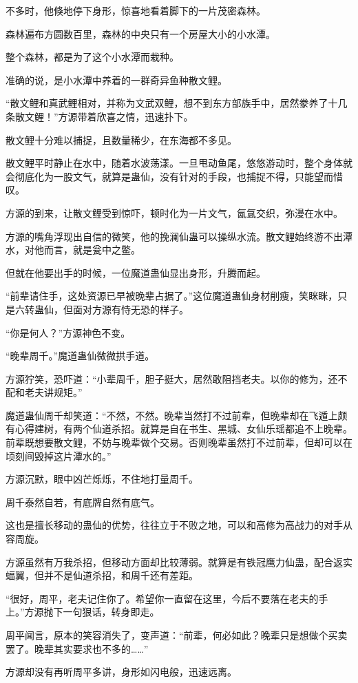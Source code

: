 \begin{this_body}
不多时，他倏地停下身形，惊喜地看着脚下的一片茂密森林。

森林遍布方圆数百里，森林的中央只有一个房屋大小的小水潭。

整个森林，都是为了这个小水潭而栽种。

准确的说，是小水潭中养着的一群奇异鱼种散文鲤。

“散文鲤和真武鲤相对，并称为文武双鲤，想不到东方部族手中，居然豢养了十几条散文鲤！”方源带着欣喜之情，迅速扑下。

散文鲤十分难以捕捉，且数量稀少，在东海都不多见。

散文鲤平时静止在水中，随着水波荡漾。一旦甩动鱼尾，悠悠游动时，整个身体就会彻底化为一股文气，就算是蛊仙，没有针对的手段，也捕捉不得，只能望而惜叹。

方源的到来，让散文鲤受到惊吓，顿时化为一片文气，氤氲交织，弥漫在水中。

方源的嘴角浮现出自信的微笑，他的挽澜仙蛊可以操纵水流。散文鲤始终游不出潭水，对他而言，就是瓮中之鳖。

但就在他要出手的时候，一位魔道蛊仙显出身形，升腾而起。

“前辈请住手，这处资源已早被晚辈占据了。”这位魔道蛊仙身材削瘦，笑眯眯，只是六转蛊仙，但面对方源有恃无恐的样子。

“你是何人？”方源神色不变。

“晚辈周千。”魔道蛊仙微微拱手道。

方源狞笑，恐吓道：“小辈周千，胆子挺大，居然敢阻挡老夫。以你的修为，还不配和老夫讲规矩。”

魔道蛊仙周千却笑道：“不然，不然。晚辈当然打不过前辈，但晚辈却在飞遁上颇有心得建树，有两个仙道杀招。就算是自在书生、黑城、女仙乐瑶都追不上晚辈。前辈既想要散文鲤，不妨与晚辈做个交易。否则晚辈虽然打不过前辈，但却可以在顷刻间毁掉这片潭水的。”

方源沉默，眼中凶芒烁烁，不住地打量周千。

周千泰然自若，有底牌自然有底气。

这也是擅长移动的蛊仙的优势，往往立于不败之地，可以和高修为高战力的对手从容周旋。

方源虽然有万我杀招，但移动方面却比较薄弱。就算是有铁冠鹰力仙蛊，配合返实蝠翼，但并不是仙道杀招，和周千还有差距。

“很好，周平，老夫记住你了。希望你一直留在这里，今后不要落在老夫的手上。”方源抛下一句狠话，转身即走。

周平闻言，原本的笑容消失了，变声道：“前辈，何必如此？晚辈只是想做个买卖罢了。晚辈其实要求也不多的……”

方源却没有再听周平多讲，身形如闪电般，迅速远离。


\end{this_body}
